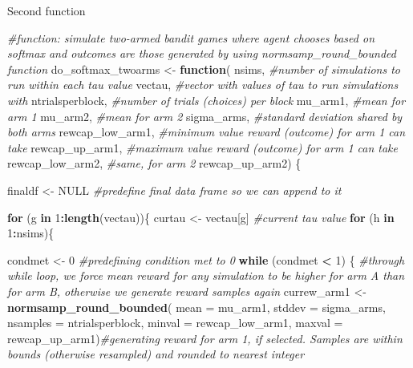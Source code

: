 \documentclass[
]{article}
\newenvironment{Shaded}{\begin{snugshade}}{\end{snugshade}}
\newcommand{\AttributeTok}[1]{\textcolor[rgb]{0.13,0.29,0.53}{#1}}
\newcommand{\CommentTok}[1]{\textcolor[rgb]{0.56,0.35,0.01}{\textit{#1}}}
\newcommand{\ConstantTok}[1]{\textcolor[rgb]{0.56,0.35,0.01}{#1}}
\newcommand{\ControlFlowTok}[1]{\textcolor[rgb]{0.13,0.29,0.53}{\textbf{#1}}}
\newcommand{\DecValTok}[1]{\textcolor[rgb]{0.00,0.00,0.81}{#1}}
\newcommand{\FunctionTok}[1]{\textcolor[rgb]{0.13,0.29,0.53}{\textbf{#1}}}
\newcommand{\NormalTok}[1]{#1}
\newcommand{\OtherTok}[1]{\textcolor[rgb]{0.56,0.35,0.01}{#1}}
\newcommand{\SpecialCharTok}[1]{\textcolor[rgb]{0.81,0.36,0.00}{\textbf{#1}}}
\begin{document}
Second function

\begin{Shaded}
\begin{Highlighting}[]
\CommentTok{\#function: simulate two{-}armed bandit games where agent chooses based on softmax and outcomes are those generated by using normsamp\_round\_bounded function}
\NormalTok{do\_softmax\_twoarms }\OtherTok{\textless{}{-}} \ControlFlowTok{function}\NormalTok{(}
\NormalTok{    nsims, }\CommentTok{\#number of simulations to run within each tau value}
\NormalTok{    vectau, }\CommentTok{\#vector with values of tau to run simulations with}
\NormalTok{    ntrialsperblock, }\CommentTok{\#number of trials (choices) per block}
\NormalTok{    mu\_arm1, }\CommentTok{\#mean for arm 1}
\NormalTok{    mu\_arm2, }\CommentTok{\#mean for arm 2}
\NormalTok{    sigma\_arms, }\CommentTok{\#standard deviation shared by both arms}
\NormalTok{    rewcap\_low\_arm1, }\CommentTok{\#minimum value reward (outcome) for arm 1 can take}
\NormalTok{    rewcap\_up\_arm1, }\CommentTok{\#maximum value reward (outcome) for arm 1 can take}
\NormalTok{    rewcap\_low\_arm2, }\CommentTok{\#same, for arm 2}
\NormalTok{    rewcap\_up\_arm2) \{}
  
\NormalTok{  finaldf }\OtherTok{\textless{}{-}} \ConstantTok{NULL} \CommentTok{\#predefine final data frame so we can append to it}
  
  \ControlFlowTok{for}\NormalTok{ (g }\ControlFlowTok{in} \DecValTok{1}\SpecialCharTok{:}\FunctionTok{length}\NormalTok{(vectau))\{}
\NormalTok{    curtau }\OtherTok{\textless{}{-}}\NormalTok{ vectau[g] }\CommentTok{\#current tau value}
    \ControlFlowTok{for}\NormalTok{ (h }\ControlFlowTok{in} \DecValTok{1}\SpecialCharTok{:}\NormalTok{nsims)\{ }
      
\NormalTok{      condmet }\OtherTok{\textless{}{-}} \DecValTok{0} \CommentTok{\#predefining condition met to 0}
      \ControlFlowTok{while}\NormalTok{ (condmet }\SpecialCharTok{\textless{}} \DecValTok{1}\NormalTok{) \{ }\CommentTok{\#through while loop, we force mean reward for any simulation to be higher for arm A than for arm B, otherwise we generate reward samples again}
\NormalTok{        currew\_arm1 }\OtherTok{\textless{}{-}} \FunctionTok{normsamp\_round\_bounded}\NormalTok{(}
          \AttributeTok{mean =}\NormalTok{ mu\_arm1,}
          \AttributeTok{stddev =}\NormalTok{ sigma\_arms, }
          \AttributeTok{nsamples =}\NormalTok{ ntrialsperblock, }
          \AttributeTok{minval =}\NormalTok{ rewcap\_low\_arm1, }
          \AttributeTok{maxval =}\NormalTok{ rewcap\_up\_arm1)}\CommentTok{\#generating reward for arm 1, if selected. Samples are within bounds (otherwise resampled) and rounded to nearest integer}
        

\end{Highlighting}
\end{Shaded}
\end{document}
